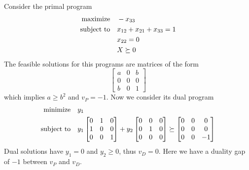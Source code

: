 \documentclass[a4paper,twoside,justified]{tufte-handout}
\begin{document}
\begin{example}\label{eg:sdp-duality-gap}
  Consider the primal program 
  \begin{alignat}{2}
    \text{maximize}\hspace{1em}& -x_{33}\\
    \text{subject to}\hspace{1em}& x_{12} + x_{21} + x_{33} = 1\\
    & x_{22}=0\\
    & X \succeq 0
  \end{alignat}
  The feasible solutions for this programs are matrices of the form 
  \begin{equation}
    \begin{bmatrix}
      a & 0 & b\\
      0 & 0 & 0\\
      b & 0 & 1
    \end{bmatrix}
  \end{equation}
 which implies $ a \geq b^{2} $ and $ v_{P}=-1 $. Now we consider its dual
 program
  \begin{alignat}{2}
    \text{minimize}\hspace{1em}& y_{1}\\
    \text{subject to}\hspace{1em}& y_{1} \begin{bmatrix}
      0 & 1 & 0\\
      1 & 0 & 0\\
      0 & 0 & 1
    \end{bmatrix} + 
    y_{2} \begin{bmatrix}
      0 & 0 & 0\\
      0 & 1 & 0\\
      0 & 0 & 0
    \end{bmatrix} 
    \succeq 
    \begin{bmatrix}
      0 & 0 & 0\\
      0 & 0 & 0\\
      0 & 0 & -1
    \end{bmatrix}
  \end{alignat}
  Dual solutions have $ y_{1}=0 $ and $ y_{2}\geq 0 $, thus $ v_{D}=0
  $. Here we have a duality gap of $-1$ between $ v_{P}$ and $ v_{D} $.
\end{example}
\end{document}
